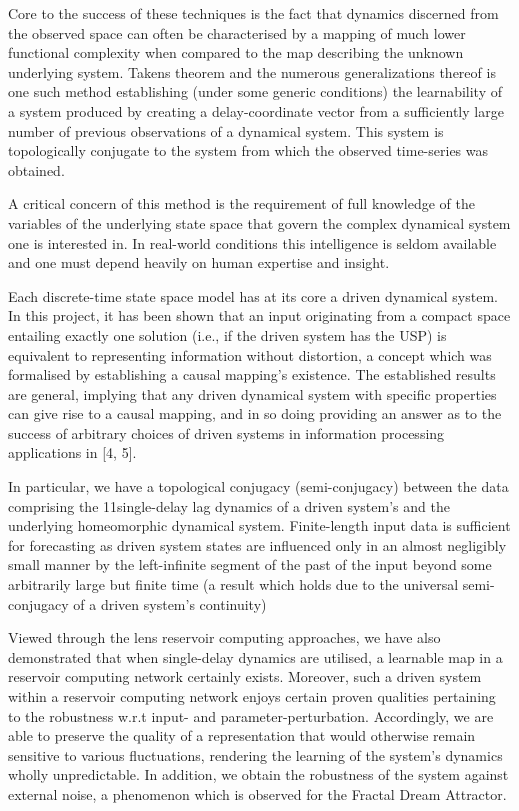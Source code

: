 \documentclass[a4paper,12pt,twoside]{report}
\begin{document}
Core to the success of these techniques is the fact that dynamics discerned from the observed space can often be characterised by a mapping of much lower functional complexity when compared to the map describing the unknown underlying system. Takens theorem and the numerous generalizations thereof is one such method establishing (under some generic conditions) the learnability of a system produced by creating a delay-coordinate vector from a sufficiently large number of previous observations of a dynamical system. This system is topologically conjugate to the system from which the observed time-series was obtained.

A critical concern of this method is the requirement of full knowledge of the variables of the underlying state space that govern the complex dynamical system one is interested in. In real-world conditions this intelligence is seldom available and one must depend heavily on human expertise and insight. 

Each discrete-time state space model has at its core a driven dynamical system. In this project, it has been shown that an input originating from a compact space entailing exactly one solution (i.e., if the driven system has the USP) is equivalent to representing information without distortion, a concept which was formalised by establishing a causal mapping’s existence. The established results are general, implying that any driven dynamical system with specific properties can give rise to a causal mapping, and in so doing  providing an answer as to the success of arbitrary choices of driven systems in information processing applications in [4, 5].

In particular, we have a topological conjugacy (semi-conjugacy) between the data comprising the 11single-delay lag dynamics of a driven system’s and the underlying homeomorphic dynamical system. Finite-length input data is sufficient for forecasting as driven system states are influenced only in an almost negligibly small manner by the left-infinite segment of the past of the input beyond some arbitrarily large but finite time (a result which holds due to the universal semi-conjugacy of a driven system’s continuity)


Viewed through the lens reservoir computing approaches, we have also demonstrated that when single-delay dynamics are utilised, a learnable map in a reservoir computing network certainly exists. Moreover, such a driven system within a reservoir computing network enjoys certain proven qualities pertaining to the robustness w.r.t input- and parameter-perturbation. Accordingly, we are able to preserve the quality of a representation that would otherwise remain sensitive to various fluctuations, rendering the learning of the system’s dynamics wholly unpredictable. In addition, we obtain the robustness of the system against external noise, a phenomenon which is observed for the Fractal Dream Attractor.
\end{document}
